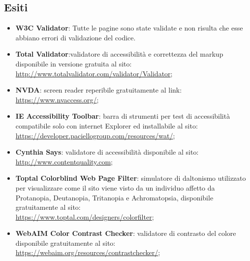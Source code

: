 \documentclass[a4paper,12pt]{article}
\begin{document}
\subsection{Esiti}
\begin{itemize}
	\item \textbf{W3C Validator}: Tutte le pagine sono state validate e non risulta che esse abbiano errori di validazione del codice.
	
	\item \textbf{Total Validator}:validatore di accessibilità e correttezza del markup disponibile in versione gratuita al sito:\\
	\url{http://www.totalvalidator.com/validator/Validator};
	
	\item \textbf{NVDA}: screen reader reperibile gratuitamente al link:\\
	\url{https://www.nvaccess.org/};
	
	\item \textbf{IE Accessibility Toolbar}: barra di strumenti per test di accessibilità compatibile solo con internet Explorer ed installabile al sito:\\
	\url{https://developer.paciellogroup.com/resources/wat/};
	
	\item \textbf{Cynthia Says}: validatore di accessibilità disponibile al sito:\\
	\url{http://www.contentquality.com};
	
	\item \textbf{Toptal Colorblind Web Page Filter}: simulatore di daltonismo utilizzato per visualizzare come il sito viene visto da un individuo affetto da Protanopia, Deutanopia, Tritanopia e Achromatopsia, disponibile gratuitamente al sito:\\
	\url{https://www.toptal.com/designers/colorfilter};
	
	\item \textbf{WebAIM Color Contrast Checker}: validatore di contrasto del colore disponibile gratuitamente al sito:\\
	\url{https://webaim.org/resources/contrastchecker/};
\end{itemize}
\end{document}
